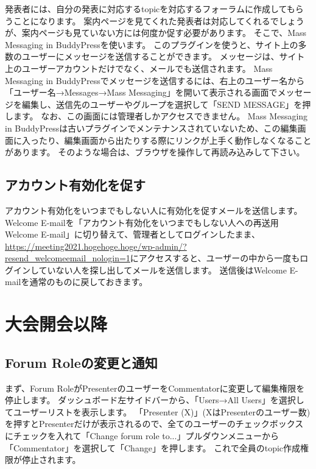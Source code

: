 \documentclass[titlepage,10pt,a4paper,uplatex]{jsbook}
\begin{document}
発表者には、自分の発表に対応するtopicを対応するフォーラムに作成してもらうことになります。
案内ページを見てくれた発表者は対応してくれるでしょうが、案内ページも見ていない方には何度か促す必要があります。
そこで、Mass Messaging in BuddyPressを使います。
このプラグインを使うと、サイト上の多数のユーザーにメッセージを送信することができます。
メッセージは、サイト上のユーザーアカウントだけでなく、メールでも送信されます。
Mass Messaging in BuddyPressでメッセージを送信するには、右上のユーザー名から「ユーザー名→Messages→Mass Messaging」を開いて表示される画面でメッセージを編集し、送信先のユーザーやグループを選択して「SEND MESSAGE」を押します。
なお、この画面には管理者しかアクセスできません。
Mass Messaging in BuddyPressは古いプラグインでメンテナンスされていないため、この編集画面に入ったり、編集画面から出たりする際にリンクが上手く動作しなくなることがあります。
そのような場合は、ブラウザを操作して再読み込みして下さい。

\subsection{アカウント有効化を促す}

アカウント有効化をいつまでもしない人に有効化を促すメールを送信します。
Welcome E-mailを「アカウント有効化をいつまでもしない人への再送用Welcome E-mail」に切り替えて、管理者としてログインしたまま、\url{https://meeting2021.hogehoge.hoge/wp-admin/?resend_welcomeemail_nologin=1}にアクセスすると、ユーザーの中から一度もログインしていない人を探し出してメールを送信します。
送信後はWelcome E-mailを通常のものに戻しておきます。

\section{大会開会以降}

\subsection{Forum Roleの変更と通知}

まず、Forum RoleがPresenterのユーザーをCommentatorに変更して編集権限を停止します。
ダッシュボード左サイドバーから、「Users→All Users」を選択してユーザーリストを表示します。
「Presenter (X)」(XはPresenterのユーザー数)を押すとPresenterだけが表示されるので、全てのユーザーのチェックボックスにチェックを入れて「Change forum role to...」プルダウンメニューから「Commentator」を選択して「Change」を押します。
これで全員のtopic作成権限が停止されます。
\end{document}
